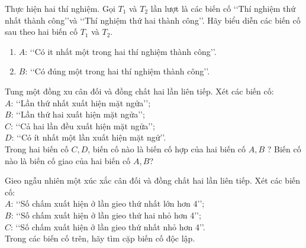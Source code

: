 \begin{bt}%
	Thực hiện hai thí nghiệm. Gọi $T_1$ và $T_2$ lần lượt là các biến cố \lq\lq Thí nghiệm thứ nhất thành công\rq\rq và \lq\lq Thí nghiệm thứ hai thành công\rq\rq. Hãy biểu diễn các biến cố sau theo hai biến cố $T_1$ và $T_2$.
	\begin{enumerate}
	\item $A$: \lq\lq Có it nhất một trong hai thí nghiệm thành công\rq\rq.
	\item $B$: \lq\lq Có đúng một trong hai thí nghiệm thành công\rq\rq.
	\end{enumerate}
\end{bt}
\begin{bt}%
	Tung một đồng xu cân đối và đồng chất hai lần liên tiếp. Xét các biến cố:\\
	$A$: \lq\lq Lần thứ nhất xuất hiện mặt ngửa\rq\rq;\\
	$B$: \lq\lq Lần thứ hai xuất hiện mặt ngửa\rq\rq;\\
	$C$: \lq\lq Cả hai lần đều xuất hiện mặt ngửa\rq\rq;\\
	$D$: \lq\lq Có ít nhất một lần xuất hiện mặt ngử\rq\rq.\\
	Trong hai biến cố $C, D$, biến cố nào là biến cố hợp của hai biến cố $A, B$ ? Biến cố nào là biến cố giao của hai biến cố $A, B$?
\end{bt}
\begin{bt}%
	Gieo ngẫu nhiên một xúc xắc cân đối và đồng chất hai lần liên tiếp. Xét các biến cố:\\
	$A$: \lq\lq Số chấm xuất hiện ở lần gieo thứ nhất lớn hơn 4\rq\rq ;\\
	$B$: \lq\lq Số chấm xuất hiện ở lần gieo thứ hai nhỏ hơn 4\rq\rq ;\\
	$C$: \lq\lq Số chấm xuất hiện ở lần gieo thứ nhất nhỏ hơn 4\rq\rq.\\
	Trong các biến cố trên, hãy tìm cặp biến cố độc lập.
\end{bt}
